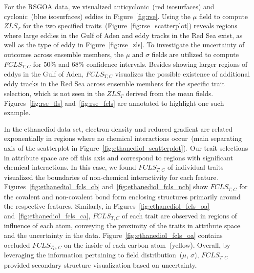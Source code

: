For the RSGOA data, we visualized anticyclonic~(red isosurfaces) and cyclonic~(blue isosurfaces) eddies in Figure~\ref{fig:rse}. 
%
Using the $\mu$ field to compute $ZLS_{T}$ for the two specified traits~(Figure~\ref{fig:rse_scatterplot}) reveals regions where large eddies in the Gulf of Aden and eddy tracks in the Red Sea exist, as well as the type of eddy in Figure~\ref{fig:rse_zls}.
%
To investigate the uncertainty of outcomes across ensemble members, the $\mu$ and $\sigma$ fields are utilized to compute $FCLS_{T,C}$ for 50\% and 68\% confidence intervals.
%
Besides showing larger regions of eddys in the Gulf of Aden, $FCLS_{T,C}$ visualizes the possible existence of additional eddy tracks in the Red Sea across ensemble members for the specific trait selection, which is not seen in the $ZLS_{T}$ derived from the mean fields.
%
Figures~\ref{fig:rse_fls} and~\ref{fig:rse_fcls} are annotated to highlight one such example.
%

%
In the ethanediol data set, electron density and reduced gradient are related exponentially in regions where no chemical interactions occur~(main separating axis of the scatterplot in Figure~\ref{fig:ethanediol_scatterplot}).
%
%
Our trait selections in attribute space are off this axis and correspond to regions with significant chemical interactions.
%
%
In this case, we found $FCLS_{T,C}$ of individual traits visualized the boundaries of non-chemical interactivity for each feature. 
%
Figures~\ref{fig:ethanediol_fcls_cb} and~\ref{fig:ethanediol_fcls_ncb} show $FCLS_{T,C}$ for the covalent and non-covalent bond form enclosing structures primarily around the respective features.
%
Similarly, in Figures~\ref{fig:ethanediol_fcls_oa} and~\ref{fig:ethanediol_fcls_ca}, $FCLS_{T,C}$ of each trait are observed in regions of influence of each atom, conveying the proximity of the traits in attribute space and the uncertainty in the data.
%
Figure~\ref{fig:ethanediol_fcls_oa} contains occluded $FCLS_{T_{C},C}$ on the inside of each carbon atom~(yellow). 
%
Overall, by leveraging the information pertaining to field distribution~(${\mu}$, ${\sigma}$), $FCLS_{T,C}$ provided secondary structure visualization based on uncertainty.
%
%


